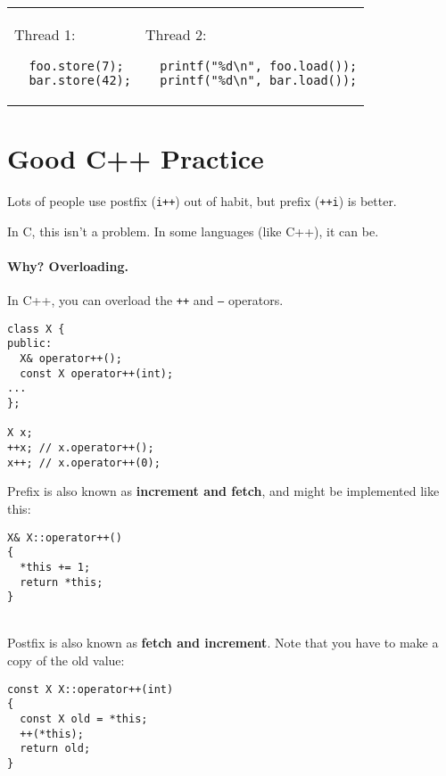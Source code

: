     \begin{tabular}{ll}
      \begin{minipage}{.25\textwidth}
        Thread 1:
        \begin{verbatim}
  foo.store(7);
  bar.store(42);
        \end{verbatim}
      \end{minipage} &
      \begin{minipage}{.45\textwidth}
        Thread 2:
        \begin{verbatim}
  printf("%d\n", foo.load());
  printf("%d\n", bar.load());
        \end{verbatim}
      \end{minipage}
    \end{tabular}



\section*{Good C++ Practice}
Lots of people use postfix ({\tt i++}) out of habit, but prefix ({\tt ++i}) is better.

In C, this isn't a problem. 
In some languages (like C++), it can be.

\paragraph{Why? Overloading.} In C++, you can overload the {\tt ++} and {\tt --} operators.

  \begin{verbatim}
class X {
public:
  X& operator++();
  const X operator++(int);
...
};

X x;
++x; // x.operator++();
x++; // x.operator++(0);
  \end{verbatim}

Prefix is also known as {\bf increment and fetch}, and might be implemented like this:
  \begin{verbatim}
X& X::operator++()
{
  *this += 1;
  return *this;
}
  \end{verbatim}
~\\[1em]

  Postfix is also known as {\bf fetch and increment}. Note that you have to make a copy of
the old value:
  \begin{verbatim}
const X X::operator++(int)
{
  const X old = *this;
  ++(*this);
  return old;
}
  \end{verbatim}

